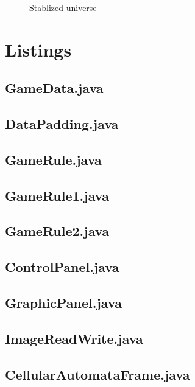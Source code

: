 \documentclass[12pt,a4paper]{article}
\begin{document}
\begin{figure}[h!]
        \caption{Stablized universe}
\end{figure}

\newpage
\section{Listings} 
\subsection{GameData.java}

\subsection{DataPadding.java}

\subsection{GameRule.java}

\subsection{GameRule1.java}

\subsection{GameRule2.java}

\subsection{ControlPanel.java}

\subsection{GraphicPanel.java}

\subsection{ImageReadWrite.java}

\subsection{CellularAutomataFrame.java}

\end{document}
